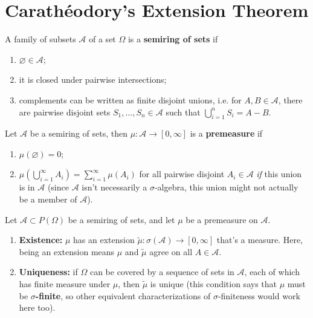 \documentclass[twoside,10pt]{article}
\begin{document}
\section{Carath\'eodory's Extension Theorem}

\begin{defn}[]
A family of subsets $\mathcal{A}$ of a set $\Omega$ is a \textbf{semiring of sets} if
\begin{enumerate}
	\item $\varnothing \in \mathcal{A}$;
	\item it is closed under pairwise intersections;
	\item complements can be written as finite disjoint unions, i.e. for $A,B \in \mathcal{A}$, there are pairwise disjoint sets $S_1,\dots,S_{n} \in \mathcal{A}$ such that $\bigcup_{i=1}^{n}S_{i} = A-B$.
\end{enumerate}
\end{defn}

\begin{defn}[]
Let $\mathcal{A}$ be a semiring of sets, then $\mu: \mathcal{A}\to [0,\infty]$ is a \textbf{premeasure} if
\begin{enumerate}
	\item $\mu(\varnothing)=0$;
	\item $\mu\left( \bigcup_{i=1}^{\infty}A_{i} \right) = \sum_{i=1}^{\infty}\mu(A_{i})$ for all pairwise disjoint $A_{i} \in \mathcal{A}$ \textit{if} this union is in $\mathcal{A}$ (since $\mathcal{A}$ isn't necessarily a $\sigma$-algebra, this union might not actually be a member of $\mathcal{A}$).
\end{enumerate}
\end{defn}

\begin{thrm}
	Let $\mathcal{A} \subset P(\Omega)$ be a semiring of sets, and let $\mu$ be a premeasure on $\mathcal{A}$.
	\begin{enumerate}
		\item \textbf{Existence:} $\mu$ has an extension $ \tilde{\mu}: \sigma(\mathcal{A}) \to [0,\infty]$ that's a measure. Here, being an extension means $\mu$ and $\tilde{\mu}$ agree on all $A \in \mathcal{A}$.
		\item \textbf{Uniqueness:} if $\Omega$ can be covered by a sequence of sets in $\mathcal{A}$, each of which has finite measure under $\mu$, then $\tilde{\mu}$ is unique (this condition says that $\mu$ must be $\sigma$\textbf{-finite}, so other equivalent characterizations of $\sigma$-finiteness would work here too).
	\end{enumerate}
\end{thrm}
\end{document}
